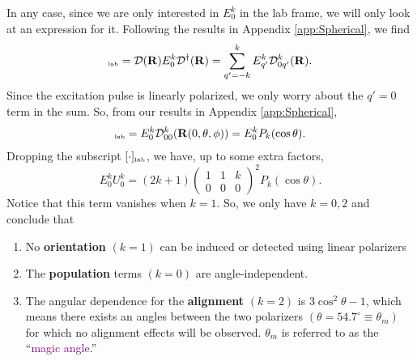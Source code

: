 \documentclass[11pt]{article}
\newcommand{\tj}[6]{ \begin{pmatrix}
		#1 & #2 & #3 \\
		#4 & #5 & #6 
\end{pmatrix}}
\begin{document}
In any case, since we are only interested in $E^k_0$ in the lab frame, we will only look at an expression for it. Following the results in Appendix \ref{app:Spherical}, we find 
\begin{align*}
[E^k_0]_{\tiny\mbox{lab}} 
= \mathcal{D}(\mathbf{R}) E^k_0 \mathcal{D}^\dagger(\mathbf{R}) = \sum^k_{q' = -k} E^k_{q'} \mathcal{D}^k_{0q'}(\mathbf{R}).
\end{align*}
Since the excitation pulse is linearly polarized, we only worry about the $q' = 0$ term in the sum. So, from our results in Appendix \ref{app:Spherical},
\begin{align*}
[E^k_0]_{\tiny\mbox{lab}} 
=  E^k_{0} \mathcal{D}^k_{00}(\mathbf{R}(0,\theta,\phi)) 
= E^k_0 P_k(\cos\theta).
\end{align*}
Dropping the subscript $[\cdot]_{\tiny{\mbox{lab}}}$, we have, up to some extra factors, 
\begin{equation*}
E^k_0 U^k_0 = (2k+1)\tj{1}{1}{k}{0}{0}{0}^2 P_k(\cos\theta).
\end{equation*}
Notice that this term vanishes when $k=1$. So, we only have $k=0,2$ and conclude that
\begin{enumerate}
	\item No \textbf{orientation} $(k=1)$ can be induced or detected using linear polarizers
	\item The \textbf{population} terms $(k=0)$ are angle-independent. 
	\item The angular dependence for the \textbf{alignment} $(k=2)$ is $3\cos^2\theta - 1$, which means there exists an angles between the two polarizers $(\theta = 54.7^\circ \equiv \theta_m)$ for which no alignment effects will be observed. $\theta_m$ is referred to as the ``\textcolor{purple}{magic angle}.''
\end{enumerate} 
\end{document}
